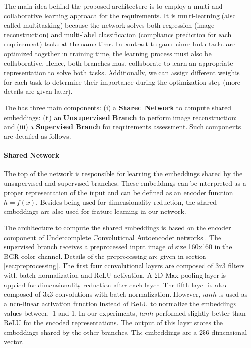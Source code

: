 The main idea behind the proposed architecture is to employ a multi and collaborative learning approach for the \icao requirements. It is multi-learning (also called multitasking) because the network solves both regression (image reconstruction) and multi-label classification (compliance prediction for each requirement) tasks at the same time. In contrast to \acfp{gan}, since both tasks are optimized together in training time, the learning process must also be collaborative. Hence, both branches must collaborate to learn an appropriate representation to solve both tasks. Additionally, we can assign different weights for each task to determine their importance during the optimization step (more details are given later).

The \methodname has three main components: (i) a \textbf{Shared Network} to compute shared embeddings; (ii) an \textbf{Unsupervised Branch} to perform image reconstruction; and (iii) a \textbf{Supervised Branch} for requirements assessment. Such components are detailed as follows.

\paragraph{Shared Network}

The top of the network is responsible for learning the embeddings shared by the unsupervised and supervised branches. These embeddings can be interpreted as a proper representation of the input and can be defined as an encoder function $h = f(x)$. Besides being used for dimensionality reduction, the shared embeddings are also used for feature learning in our network.

The architecture to compute the shared embeddings is based on the encoder component of Undercomplete Convolutional Autoencoder networks \citep{goodfellow2016deep}. The supervised branch receives a preprocessed input image of size 160x160 in the BGR color channel. Details of the preprocessing are given in section \ref{sec:preprocessing}. The first four convolutional layers are composed of 3x3 filters with batch normalization and ReLU activation. A 2D Max-pooling layer is applied for dimensionality reduction after each layer. The fifth layer is also composed of 3x3 convolutions with batch normalization. However, $tanh$ is used as a non-linear activation function instead of ReLU to normalize the embeddings values between -1 and 1. In our experiments, $tanh$ performed slightly better than ReLU for the encoded representations. The output of this layer stores the embeddings shared by the other branches. The embeddings are a 256-dimensional vector.

